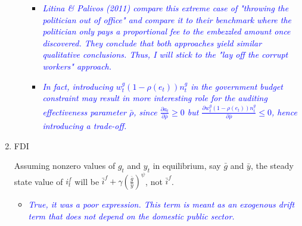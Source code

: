 \documentclass[]{scrartcl}
\begin{document}
\begin{enumerate}
\begin{itemize}
\begin{itemize}
\item \textcolor{blue}{\textit{Litina \& Palivos (2011) compare this extreme case of "throwing the politician out of office" and compare it to their benchmark where the politician only pays a proportional fee to the embezzled amount once discovered. They conclude that both approaches yield similar qualitative conclusions. Thus, I will stick to the "lay off the corrupt workers" approach.}}
\item \textcolor{blue}{\textit{In fact, introducing $ w^g_t (1-\rho(e_t))n^g_t $ in the government budget constraint may result in more interesting role for the auditing effectiveness parameter $ \bar{\rho} $, since $ \frac{\partial a_t}{\partial \bar{\rho}}\geq 0 $ but $ \frac{\partial w^g_t (1-\rho(e_t))n^g_t}{\partial \bar{\rho}}\leq0 $, hence introducing a trade-off.}}
\end{itemize}

\end{itemize}
\item FDI

Assuming nonzero values of $ g_t $ and $ y_t $ in equilibrium, say $ \bar{g} $ and $ \bar{y} $, the steady state value of $ i^f_t $ will be $ \bar{i}^f + \gamma \left(\frac{\bar{g}}{\bar{y}}\right)^{\psi} $, not $ \bar{i}^f $.
\begin{itemize}
\item \textcolor{blue}{\textit{True, it was a poor expression. This term is meant as an exogenous drift term that does not depend on the domestic public sector.}}
\end{itemize}
\end{enumerate}
\end{document}
